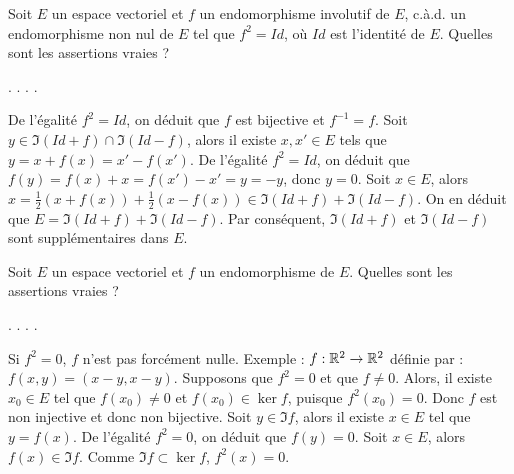\begin{question}
Soit $E$ un espace vectoriel et $f$ un endomorphisme involutif de $E$, c.à.d. un endomorphisme non nul de $E$ tel que $f^2=Id$, où $Id$ est l'identité de $E$. Quelles sont les assertions vraies ?
\begin{answers}  
.
.
.
.
\end{answers}
\begin{explanations} De l'égalité $f^2=Id$, on déduit que $f$ est bijective et $f^{-1}=f$.
\vskip0mm
Soit $y\in \Im (Id+f) \cap \Im (Id-f)$, alors il existe $x,x'\in E$ tels que $y=x+f(x)=x'-f(x')$. De l'égalité $f^2=Id$, on déduit que  $f(y)=f(x)+x=f(x')-x'=y=-y$, donc $y=0$.
\vskip0mm
Soit $x\in E$, alors $\displaystyle x=\frac{1}{2}(x+f(x))+\frac{1}{2}(x-f(x)) \in \Im (Id+f)+\Im (Id-f)$. On en déduit que $E= \Im (Id+f) + \Im (Id-f)$. Par conséquent, $\Im (Id+f)$ et $\Im (Id-f)$ sont supplémentaires dans $E$.
\end{explanations}
\end{question}

\begin{question}
Soit $E$ un espace vectoriel  et $f$ un endomorphisme de $E$. Quelles sont les assertions vraies ?
\begin{answers} 
.
.
.
.
\end{answers}
\begin{explanations} Si $f^2 =0$, $f$ n'est pas forcément nulle. Exemple : $f:\mathbb{R}^2 \to \mathbb{R}^2$ définie par : $f(x,y)=(x-y,x-y)$.
\vskip0mm
Supposons que $f^2 =0$ et que $f\neq 0$. Alors, il existe $x_0\in E$ tel que $f(x_0) \neq 0$ et $f(x_0) \in \ker f$, puisque $f^2(x_0) =0$. Donc $f$ est non injective et donc non bijective.
\vskip0mm
Soit $y\in \Im f$, alors il existe $x\in E$ tel que $y=f(x)$. De l'égalité $f^2 =0$, on déduit que $f(y)=0$.
\vskip0mm
Soit $x\in E$, alors $f(x)\in \Im f$. Comme  $\Im f \subset \ker f$, $f^2(x)=0$.
\end{explanations}
\end{question}
  
